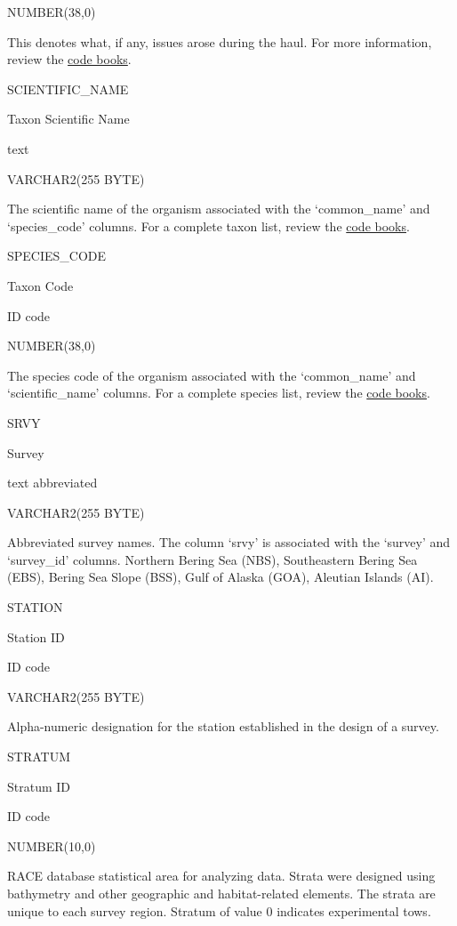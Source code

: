 \documentclass[
  letterpaper,
  oneside,
  open=any]{scrbook}
\begin{document}
NUMBER(38,0)

This denotes what, if any, issues arose during the haul. For more
information, review the
\href{https://www.fisheries.noaa.gov/resource/document/groundfish-survey-species-code-manual-and-data-codes-manual}{code
books}.

SCIENTIFIC\_NAME

Taxon Scientific Name

text

VARCHAR2(255 BYTE)

The scientific name of the organism associated with the `common\_name'
and `species\_code' columns. For a complete taxon list, review the
\href{https://www.fisheries.noaa.gov/resource/document/groundfish-survey-species-code-manual-and-data-codes-manual}{code
books}.

SPECIES\_CODE

Taxon Code

ID code

NUMBER(38,0)

The species code of the organism associated with the `common\_name' and
`scientific\_name' columns. For a complete species list, review the
\href{https://www.fisheries.noaa.gov/resource/document/groundfish-survey-species-code-manual-and-data-codes-manual}{code
books}.

SRVY

Survey

text abbreviated

VARCHAR2(255 BYTE)

Abbreviated survey names. The column `srvy' is associated with the
`survey' and `survey\_id' columns. Northern Bering Sea (NBS),
Southeastern Bering Sea (EBS), Bering Sea Slope (BSS), Gulf of Alaska
(GOA), Aleutian Islands (AI).

STATION

Station ID

ID code

VARCHAR2(255 BYTE)

Alpha-numeric designation for the station established in the design of a
survey.

STRATUM

Stratum ID

ID code

NUMBER(10,0)

RACE database statistical area for analyzing data. Strata were designed
using bathymetry and other geographic and habitat-related elements. The
strata are unique to each survey region. Stratum of value 0 indicates
experimental tows.
\end{document}
